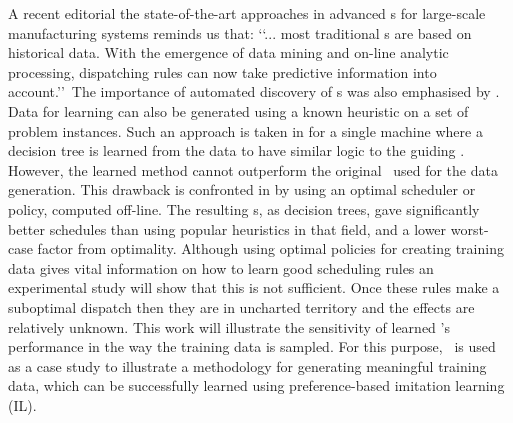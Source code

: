 \documentclass[twocolumn]{svjour3}
\begin{document}
A recent editorial the state-of-the-art approaches \cite{Chen13} in advanced 
\dr s for large-scale manufacturing systems reminds us that:
\lq\lq ... most traditional \dr s are based on historical data. 
With the emergence of data mining and on-line analytic processing, dispatching 
rules can now take predictive information into account.\rq\rq~The importance of 
automated discovery of \dr s was also emphasised by \cite{Monch13}. 
Data for learning can also be generated using a known heuristic on a set of 
problem instances.
Such an approach is taken in \cite{Siggi05} for a single machine where
a decision tree is learned from the data to have similar logic to the guiding 
\dr. 
However, the learned method cannot outperform the original \dr\ used for the 
data generation. 
This drawback is confronted in \cite{Malik08,Russell09,Siggi10} by using an 
optimal scheduler or policy, computed off-line. The 
resulting \dr s, as decision trees, gave significantly better schedules than 
using popular heuristics in that field, and a lower worst-case factor from 
optimality. 
Although using optimal policies for creating training data gives vital 
information on how to learn good scheduling rules an experimental study will 
show that this is not sufficient. 
Once these rules make a suboptimal dispatch then they are in uncharted 
territory and the effects are relatively unknown. 
This work will illustrate the sensitivity of learned \dr's performance in the 
way the training data is sampled.
For this purpose, \JSP\ is used as a case study to illustrate a methodology for 
generating meaningful training data, which can be successfully 
learned using preference-based imitation learning (IL).

\end{document}
